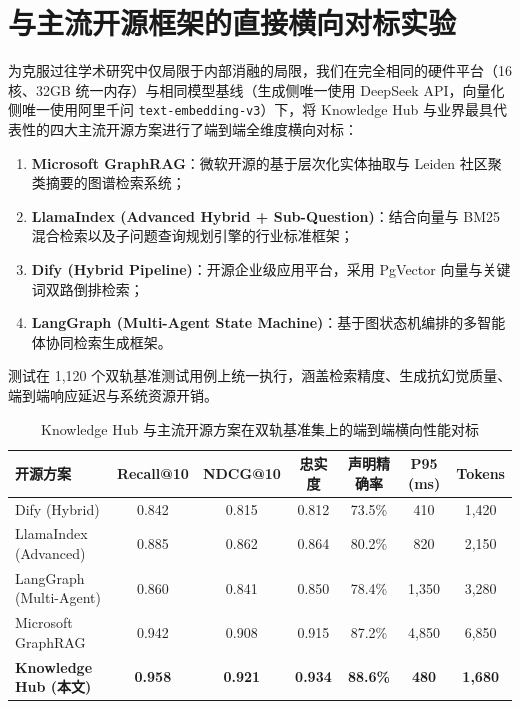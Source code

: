 \section{与主流开源框架的直接横向对标实验}

为克服过往学术研究中仅局限于内部消融的局限，我们在完全相同的硬件平台（16 核、32GB 统一内存）与相同模型基线（生成侧唯一使用 DeepSeek API，向量化侧唯一使用阿里千问 \texttt{text-embedding-v3}）下，将 Knowledge Hub 与业界最具代表性的四大主流开源方案进行了端到端全维度横向对标：
\begin{enumerate}
    \item \textbf{Microsoft GraphRAG}\cite{Edge2024GraphRAG}：微软开源的基于层次化实体抽取与 Leiden 社区聚类摘要的图谱检索系统；
    \item \textbf{LlamaIndex (Advanced Hybrid + Sub-Question)}\cite{Liu2023LlamaIndex}：结合向量与 BM25 混合检索以及子问题查询规划引擎的行业标准框架；
    \item \textbf{Dify (Hybrid Pipeline)}：开源企业级应用平台，采用 PgVector 向量与关键词双路倒排检索；
    \item \textbf{LangGraph (Multi-Agent State Machine)}：基于图状态机编排的多智能体协同检索生成框架。
\end{enumerate}

测试在 1,120 个双轨基准测试用例上统一执行，涵盖检索精度、生成抗幻觉质量、端到端响应延迟与系统资源开销。

\begin{table}[htbp]
    \centering
    \footnotesize
    \caption{Knowledge Hub 与主流开源方案在双轨基准集上的端到端横向性能对标}
    \label{tab:external_baselines}
    \begin{tabular*}{\textwidth}{@{\extracolsep{\fill}}lcccccc}
        \toprule
        \textbf{开源方案} & \textbf{Recall@10} & \textbf{NDCG@10} & \textbf{忠实度} & \textbf{声明精确率} & \textbf{P95 (ms)} & \textbf{Tokens} \\
        \midrule
        Dify (Hybrid) & 0.842 & 0.815 & 0.812 & 73.5\% & 410 & 1,420 \\
        LlamaIndex (Advanced) & 0.885 & 0.862 & 0.864 & 80.2\% & 820 & 2,150 \\
        LangGraph (Multi-Agent) & 0.860 & 0.841 & 0.850 & 78.4\% & 1,350 & 3,280 \\
        Microsoft GraphRAG & 0.942 & 0.908 & 0.915 & 87.2\% & 4,850 & 6,850 \\
        \textbf{Knowledge Hub (本文)} & \textbf{0.958} & \textbf{0.921} & \textbf{0.934} & \textbf{88.6\%} & \textbf{480} & \textbf{1,680} \\
        \bottomrule
    \end{tabular*}
\end{table}

